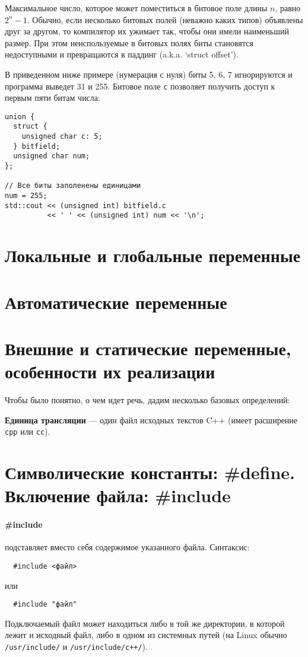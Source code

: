 \documentclass[14pt, a4paper]{extarticle}
\begin{document}
Максимальное число, которое может поместиться в битовое поле длины $n$, равно $2^n - 1$.
Обычно, если несколько битовых полей (неважно каких типов) объявлены друг за другом, то
компилятор их ужимает так, чтобы они имели наименьший размер. При этом неиспользуемые в
битовых полях биты становятся недоступными и превращаются в паддинг (a.k.a. `struct offset').

В приведенном ниже примере (нумерация с нуля) биты 5, 6, 7 игнорируются и программа
выведет 31 и 255. Битовое поле \verb|c| позволяет получить доступ к первым пяти битам числа:
\begin{verbatim}
union {
  struct {
    unsigned char c: 5;
  } bitfield;
  unsigned char num;
};

// Все биты заполенены единицами
num = 255;
std::cout << (unsigned int) bitfield.c
          << ' ' << (unsigned int) num << '\n';
\end{verbatim}


\section{Локальные и глобальные переменные}

\section{Автоматические переменные}

\section{Внешние и статические переменные, особенности их реализации}
Чтобы было понятно, о чем идет речь, дадим несколько базовых определений:

\textbf{Единица трансляции} --- один файл исходных текстов C++ (имеет расширение \verb|cpp| или \verb|cc|).

\textbf{}

\section{Символические константы: \#define. Включение файла: \#include}
\paragraph{\#include} подставляет вместо себя содержимое указанного файла. Синтаксис:
\begin{verbatim}
  #include <файл>
\end{verbatim}
или
\begin{verbatim}
  #include "файл"
\end{verbatim}
Подключаемый файл может находиться либо в той же директории, в которой лежит и исходный файл,
либо в одном из системных путей (на Linux обычно \verb|/usr/include/| и \verb|/usr/include/c++/|).
\end{document}
